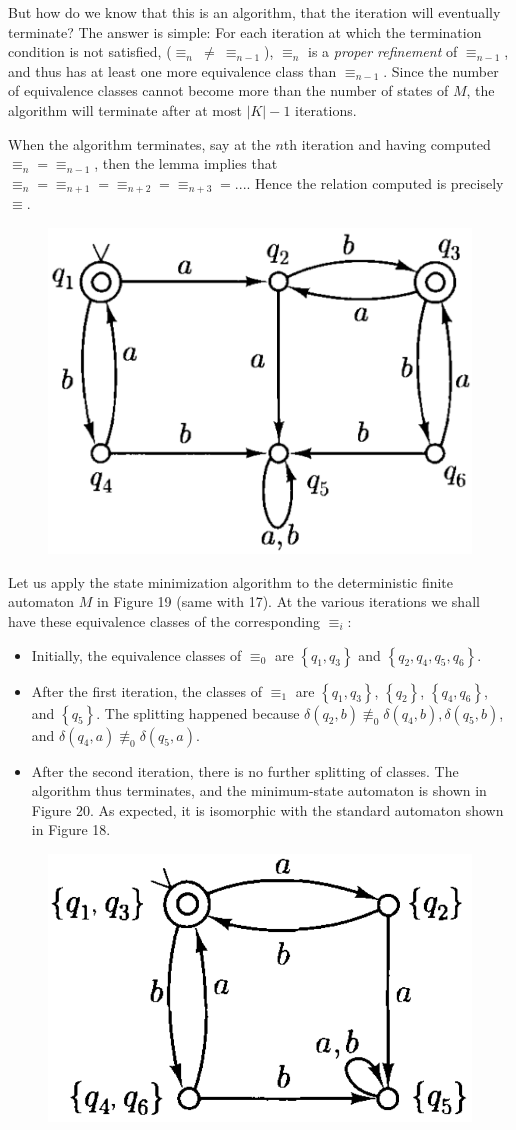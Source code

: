 But how do we know that this is an algorithm, that the iteration will eventually terminate? The answer is simple: For each iteration at which the termination condition is not satisfied, ($\equiv_n\ \neq\ \equiv_{n-1}$), $\equiv_n$ is a \textit{proper refinement} of $\equiv_{n-1}$, and thus has at least one more equivalence class than $\equiv_{n-1}$. Since the number of equivalence classes cannot become more than the number of states of $M$, the algorithm will terminate after at most $|K| - 1$ iterations.

When the algorithm terminates, say at the $n$th iteration and having computed $\equiv_{n} = \equiv_{n-1}$, then the lemma implies that $\equiv_{n} = \equiv_{n+1} = \equiv_{n+2} = \equiv_{n+3} = ...$. Hence the relation computed is precisely $\equiv$.

\begin{figure}[ht]
  \centering
  \includegraphics[width=.25\textwidth]{./img/Fig2.20.png}
  \caption{}
\end{figure}

\begin{example}{}
  Let us apply the state minimization algorithm to the deterministic finite automaton $M$ in Figure 19 (same with 17). At the various iterations we shall have these equivalence classes of the corresponding $\equiv_i$:
  \begin{itemize}
    \item Initially, the equivalence classes of $\equiv_{0}$ are $\left\{ q_1, q_3 \right\}$ and $\left\{ q_2, q_4, q_5, q_6 \right\}$.
    \item After the first iteration, the classes of $\equiv_{1}$ are $\left\{ q_1, q_3 \right\}$, $\left\{ q_2 \right\}$, $\left\{ q_4, q_6 \right\}$, and $\left\{ q_5 \right\}$. The splitting happened because $\delta(q_2, b) \not\equiv_{0} \delta(q_4, b), \delta(q_5,b)$, and $\delta(q_4, a) \not\equiv_{0} \delta(q_5,a)$.
    \item After the second iteration, there is no further splitting of classes. The algorithm thus terminates, and the minimum-state automaton is shown in Figure 20. As expected, it is isomorphic with the standard automaton shown in Figure 18.
  \end{itemize}
\end{example}

\begin{figure}[ht]
  \centering
  \includegraphics[width=.25\textwidth]{./img/fig2-22.png}
  \caption{}
\end{figure}

